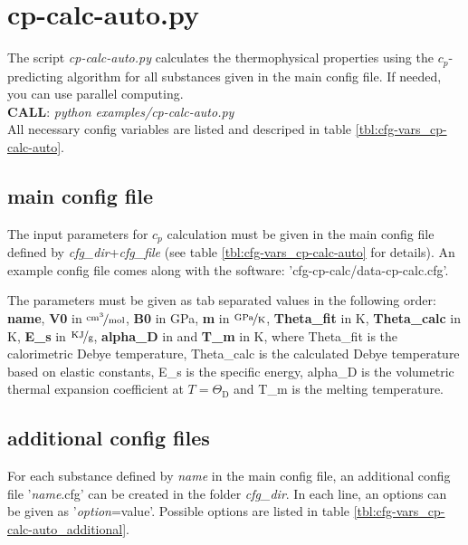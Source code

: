 %
\section{cp-calc-auto.py}
The script \emph{cp-calc-auto.py} calculates the thermophysical properties using the $c_p$-predicting algorithm for all substances given in the main config file. If needed, you can use parallel computing.\\

\textbf{CALL}: \emph{python examples/cp-calc-auto.py}\\

All necessary config variables are listed and descriped in table \ref{tbl:cfg-vars_cp-calc-auto}.
\subsection{main config file}
The input parameters for $c_p$ calculation must be given in the main config file defined by \emph{cfg\_dir}+\emph{cfg\_file} (see table \ref{tbl:cfg-vars_cp-calc-auto} for details). An example config file comes along with the software: 'cfg-cp-calc/data-cp-calc.cfg'.

The parameters must be given as tab separated values in the following order: \textbf{name}, \textbf{V0} in $\unitfrac{cm^3}{mol}$, \textbf{B0} in GPa, \textbf{m} in $\unitfrac{GPa}{K}$, \textbf{Theta\_fit} in K, \textbf{Theta\_calc} in K, \textbf{E\_s} in $\unitfrac{KJ}{g}$, \textbf{alpha\_D} in  and \textbf{T\_m} in K, where Theta\_fit is the calorimetric Debye temperature, Theta\_calc is the calculated Debye temperature based on elastic constants, E\_s is the specific energy, alpha\_D is the volumetric thermal expansion coefficient at $T=\Theta_\text{D}$ and T\_m is the melting temperature.
\subsection{additional config files}
For each substance defined by \emph{name} in the main config file, an additional config file '\emph{name}.cfg' can be created in the folder \emph{cfg\_dir}. In each line, an options can be given as '\emph{option}=value'. Possible options are listed in table \ref{tbl:cfg-vars_cp-calc-auto_additional}.


